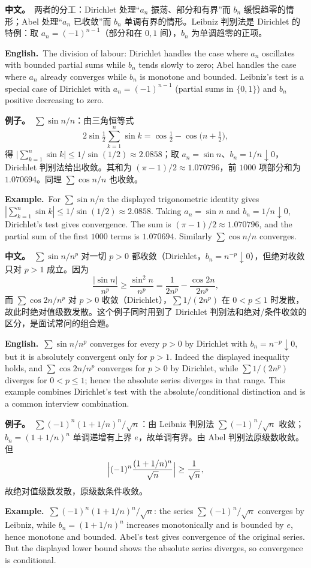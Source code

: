 \documentclass[UTF8,11pt,a4paper]{ctexart}
\newcommand{\BOTH}[2]{\par\noindent\textbf{中文。}\ #1\par\noindent\textbf{English.}\ #2\par}
\newcommand{\EX}[2]{\par\noindent\textbf{例子。}\ #1\par\noindent\textbf{Example.}\ #2\par}
\begin{document}
\BOTH{两者的分工：Dirichlet 处理“$a_n$ 振荡、部分和有界”而 $b_n$ 缓慢趋零的情形；Abel 处理“$a_n$ 已收敛”而 $b_n$ 单调有界的情形。Leibniz 判别法是 Dirichlet 的特例：取 $a_n=(-1)^{n-1}$（部分和在 $0,1$ 间），$b_n$ 为单调趋零的正项。}{The division of labour: Dirichlet handles the case where $a_n$ oscillates with bounded partial sums while $b_n$ tends slowly to zero; Abel handles the case where $a_n$ already converges while $b_n$ is monotone and bounded. Leibniz's test is a special case of Dirichlet with $a_n=(-1)^{n-1}$ (partial sums in $\{0,1\}$) and $b_n$ positive decreasing to zero.}
\EX{$\sum\sin n/n$：由三角恒等式
\[
2\sin\tfrac12\sum_{k=1}^{n}\sin k=\cos\tfrac12-\cos\bigl(n+\tfrac12\bigr),
\]
得 $\bigl|\sum_{k=1}^{n}\sin k\bigr|\le1/\sin(1/2)\approx2.0858$；取 $a_n=\sin n$、$b_n=1/n\downarrow0$，Dirichlet 判别法给出收敛。其和为 $(\pi-1)/2\approx1.070796$，前 $1000$ 项部分和为 $1.070694$。同理 $\sum\cos n/n$ 也收敛。}{For $\sum\sin n/n$ the displayed trigonometric identity gives $|\sum_{k=1}^{n}\sin k|\le1/\sin(1/2)\approx2.0858$. Taking $a_n=\sin n$ and $b_n=1/n\downarrow0$, Dirichlet's test gives convergence. The sum is $(\pi-1)/2\approx1.070796$, and the partial sum of the first $1000$ terms is $1.070694$. Similarly $\sum\cos n/n$ converges.}
\BOTH{$\sum\sin n/n^p$ 对一切 $p>0$ 都收敛（Dirichlet，$b_n=n^{-p}\downarrow0$），但绝对收敛只对 $p>1$ 成立。因为
\[
\frac{|\sin n|}{n^p}\ge\frac{\sin^2 n}{n^p}=\frac1{2n^p}-\frac{\cos2n}{2n^p},
\]
而 $\sum\cos2n/n^p$ 对 $p>0$ 收敛（Dirichlet），$\sum1/(2n^p)$ 在 $0<p\le1$ 时发散，故此时绝对值级数发散。这个例子同时用到了 Dirichlet 判别法和绝对/条件收敛的区分，是面试常问的组合题。}{$\sum\sin n/n^p$ converges for every $p>0$ by Dirichlet with $b_n=n^{-p}\downarrow0$, but it is absolutely convergent only for $p>1$. Indeed the displayed inequality holds, and $\sum\cos2n/n^p$ converges for $p>0$ by Dirichlet, while $\sum1/(2n^p)$ diverges for $0<p\le1$; hence the absolute series diverges in that range. This example combines Dirichlet's test with the absolute/conditional distinction and is a common interview combination.}
\EX{$\sum(-1)^n(1+1/n)^n/\sqrt n$：由 Leibniz 判别法 $\sum(-1)^n/\sqrt n$ 收敛；$b_n=(1+1/n)^n$ 单调递增有上界 $e$，故单调有界。由 Abel 判别法原级数收敛。但
\[
\Bigl|(-1)^n\frac{(1+1/n)^n}{\sqrt n}\Bigr|\ge\frac1{\sqrt n},
\]
故绝对值级数发散，原级数条件收敛。}{$\sum(-1)^n(1+1/n)^n/\sqrt n$: the series $\sum(-1)^n/\sqrt n$ converges by Leibniz, while $b_n=(1+1/n)^n$ increases monotonically and is bounded by $e$, hence monotone and bounded. Abel's test gives convergence of the original series. But the displayed lower bound shows the absolute series diverges, so convergence is conditional.}
\end{document}
